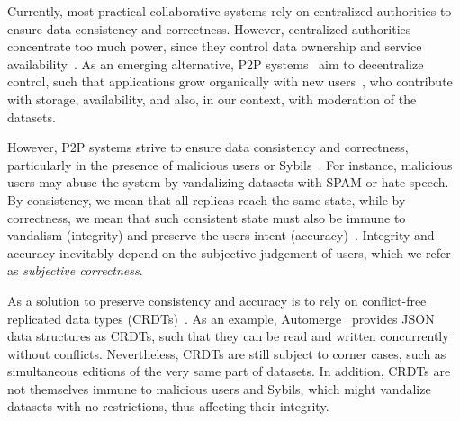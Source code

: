 \documentclass[12pt]{article}
\begin{document}
Currently, most practical collaborative systems rely on centralized authorities
to ensure data consistency and correctness.
However, centralized authorities concentrate too much power, since they control
data ownership and service availability~\cite{pincheira2022decentralized}.
As an emerging alternative, P2P systems~\cite{androutsellis2004survey} aim to
decentralize control, such that applications grow organically with new
users~\cite{rodrigues2010peer}, who contribute with storage, availability, and
also, in our context, with moderation of the datasets.

However, P2P systems strive to ensure data consistency and correctness,
particularly in the presence of malicious users or
Sybils~\cite{douceur2002sybil}.
For instance, malicious users may abuse the system by vandalizing datasets with
SPAM or hate speech.
By consistency, we mean that all replicas reach the same state, while by
correctness, we mean that such consistent state must also be immune to
vandalism (integrity) and preserve the users intent
(accuracy)~\cite{litt2022peritext}.
Integrity and accuracy inevitably depend on the subjective judgement of users,
which we refer as \emph{subjective correctness}.

As a solution to preserve consistency and accuracy is to rely on conflict-free
replicated data types (CRDTs)~\cite{shapiro2011conflict}.
As an example, Automerge~\cite{kleppmann2018automerge} provides JSON data
structures as CRDTs, such that they can be read and written concurrently
without conflicts.
Nevertheless, CRDTs are still subject to corner cases, such as simultaneous
editions of the very same part of datasets.
In addition, CRDTs are not themselves immune to malicious users and Sybils,
which might vandalize datasets with no restrictions, thus affecting their
integrity.

\end{document}
